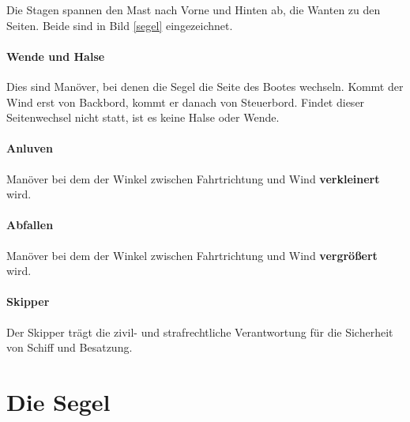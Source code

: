 \documentclass[12pt]{article}
\begin{document}
Die Stagen spannen den Mast nach Vorne und Hinten ab, die Wanten zu den Seiten. Beide sind in Bild \ref{segel} eingezeichnet.

\paragraph{Wende und Halse}
Dies sind Manöver, bei denen die Segel die Seite des Bootes wechseln. Kommt der Wind erst von Backbord, kommt er danach von Steuerbord. Findet dieser Seitenwechsel nicht statt, ist es keine Halse oder Wende.

\paragraph{Anluven}
Manöver bei dem der Winkel zwischen Fahrtrichtung und Wind \textbf{verkleinert} wird.

\paragraph{Abfallen}
Manöver bei dem der Winkel zwischen Fahrtrichtung und Wind \textbf{vergrößert} wird.

\paragraph{Skipper}
Der Skipper trägt die zivil- und strafrechtliche Verantwortung für die Sicherheit von Schiff und Besatzung.

\section{Die Segel}
\end{document}

